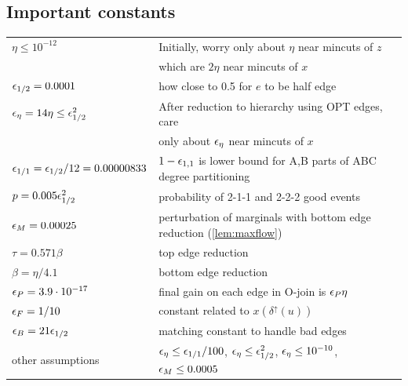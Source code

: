 {\subsection*{Important constants}
\begin{center}
 \begin{tabular}{|l |l |} 

 \hline\hline
 $\eta \le 10^{-12}$  & Initially, worry only about $\eta$ near mincuts of $z$\\
 & which are $2\eta$ near mincuts of $x$\\
${\epsilon}_{1/2} = 0.0001$ & how close to 0.5 for $e$ to be half edge \\
 ${\epsilon}_\eta = 14 \eta \le {\epsilon}_{1/2}^2$ & After reduction to hierarchy using OPT edges, care\\
 & only about ${\epsilon}_\eta$ near mincuts of $x$\\
  ${\epsilon}_{1/1}= {\epsilon}_{1/2}/12  = 0.00000833 $ & $1-{\epsilon}_{1,1}$ is lower bound for A,B parts of ABC degree partitioning\\
 $p = 0.005 {\epsilon}_{1/2}^2$   & probability of 2-1-1 and 2-2-2 good events\\
 ${\epsilon}_M = 0.00025$ & perturbation of marginals with bottom edge reduction (\cref{lem:maxflow}) \\
 $\tau = 0.571 \beta$ & top edge reduction \\
 $\beta = \eta/4.1$ & bottom edge reduction\\
 ${\epsilon}_P = 3.9 \cdot 10 ^{-17}$ & final gain on each edge in O-join is ${\epsilon}_P \eta$\\
 ${\epsilon}_F = 1/10$ & constant related to $x (\delta^\uparrow(u))$ \\
 ${\epsilon}_B = 21 {\epsilon}_{1/2}$  & matching constant to handle bad edges\\
 other assumptions & ${\epsilon}_\eta \le  {\epsilon}_{1/1}/100$, ${\epsilon}_\eta \le {\epsilon}_{1/2}^2$, ${\epsilon}_\eta \le 10 ^{-10}$, ${\epsilon}_M \le 0.0005$\\
 \hline
\end{tabular}
\end{center}

}
